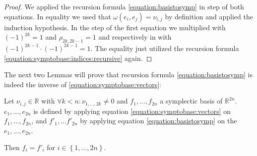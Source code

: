 \documentclass[../SymplecticSimplices.tex]{subfiles}
\begin{document}
\begin{proof}
  We applied the recursion formula \eqref{equation:basistosymp} in step  of both equations. In equality  we used that \( \omega \left( e_i, e_j \right) = \nu_{i,j} \) by definition and applied the induction hypothesis. In the step  of the first equation we multiplied with \( \left( -1 \right)^{2k} = 1 \) and \( \rho_{2k, 2k-1} = 1 \) and respectively in  with \( \left( -1 \right)^{2k-1} \cdot \left( -1 \right)^{2k-1} = 1 \). The equality  just utilized the recursion formula \eqref{equation:symptobase:indices:recursive} again.
\end{proof}

The next two Lemmas will prove that recursion formula \eqref{equation:basistosymp} is indeed the inverse of \eqref{equation:symptobase:vectors}:

\begin{lemma}
  Let \( \nu_{i,j} \in \mathbb{R} \) with \( \forall k < n : \nu_{1,\dots,2k } \neq 0 \) and \( f_1, \dots, f_{2n} \) a symplectic basis of \( \mathbb{R}^{2n} \). \( e_1, \dots, e_{2n} \) is defined by applying equation \eqref{equation:symptobase:vectors} on \( f_1, \dots, f_{2n} \), and \( f'_1, \dots f'_{2n} \) by applying equation \eqref{equation:basistosymp} on the \( e_1, \dots, e_{2n} \).

  Then \( f_i = f'_i \) for \( i \in \left\lbrace 1, \dots, 2n \right\rbrace \).
\end{lemma}
\end{document}
